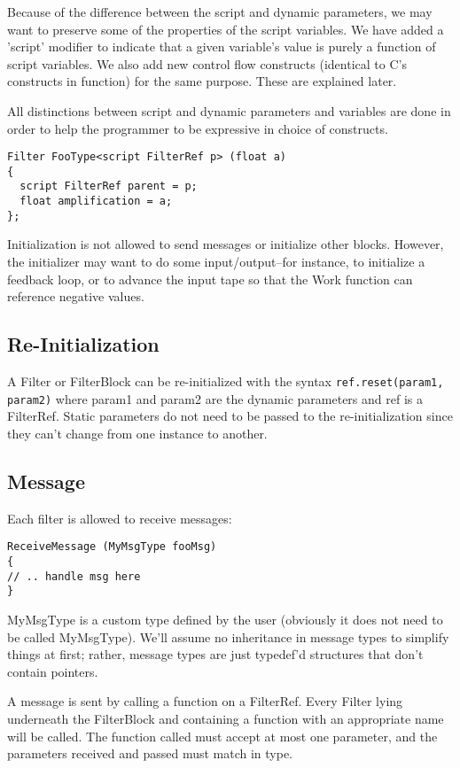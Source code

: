 \documentclass[draft]{article}
\begin{document}
Because of the difference between the script and dynamic parameters,
we may want to preserve some of the properties of the script variables.
We have added a 'script' modifier to indicate that a given variable's
value is purely a function of script variables.  We also add new control
flow constructs (identical to C's constructs in function) for the same purpose.
These are explained later.

All distinctions between script and dynamic parameters and variables
are done in order to help the programmer to be expressive in choice of
constructs.

\begin{verbatim}
Filter FooType<script FilterRef p> (float a)
{
  script FilterRef parent = p;
  float amplification = a;
};
\end{verbatim}

Initialization is not allowed to send messages or initialize other
blocks.  However, the initializer may want to do some
input/output--for instance, to initialize a feedback loop, or to
advance the input tape so that the Work function can reference
negative values.

\subsection{Re-Initialization}

A Filter or FilterBlock can be re-initialized with the syntax
{\tt ref.reset(param1, param2)} where param1 and param2 are the dynamic
parameters and ref is a FilterRef.  Static parameters do not need to
be passed to the re-initialization since they can't change from one
instance to another.

\subsection{Message}

Each filter is allowed to receive messages:

\begin{verbatim}
ReceiveMessage (MyMsgType fooMsg)
{
// .. handle msg here
}
\end{verbatim}

MyMsgType is a custom type defined by the user (obviously it does not
need to be called MyMsgType).  We'll assume no inheritance in message
types to simplify things at first; rather, message types are just
typedef'd structures that don't contain pointers.

A message is sent by calling a function on a FilterRef.  Every Filter
lying underneath the FilterBlock and containing a function with an
appropriate name will be called.  The function called must accept at
most one parameter, and the parameters received and passed must match
in type.
\end{document}
